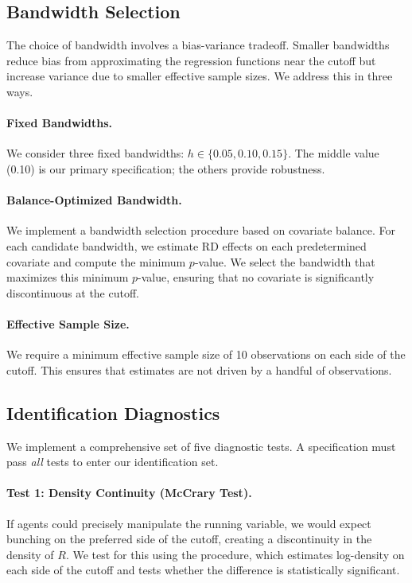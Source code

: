 \documentclass[12pt,a4paper]{article}
\begin{document}
\subsection{Bandwidth Selection}

The choice of bandwidth involves a bias-variance tradeoff. Smaller 
bandwidths reduce bias from approximating the regression functions 
near the cutoff but increase variance due to smaller effective sample 
sizes. We address this in three ways.

\paragraph{Fixed Bandwidths.}
We consider three fixed bandwidths: $h \in \{0.05, 0.10, 0.15\}$. The 
middle value (0.10) is our primary specification; the others provide 
robustness.

\paragraph{Balance-Optimized Bandwidth.}
We implement a bandwidth selection procedure based on covariate balance. 
For each candidate bandwidth, we estimate RD effects on each predetermined 
covariate and compute the minimum $p$-value. We select the bandwidth that 
maximizes this minimum $p$-value, ensuring that no covariate is 
significantly discontinuous at the cutoff.

\paragraph{Effective Sample Size.}
We require a minimum effective sample size of 10 observations on each 
side of the cutoff. This ensures that estimates are not driven by a 
handful of observations.

\subsection{Identification Diagnostics}

We implement a comprehensive set of five diagnostic tests. A specification 
must pass \textit{all} tests to enter our identification set.

\paragraph{Test 1: Density Continuity (McCrary Test).}
If agents could precisely manipulate the running variable, we would 
expect bunching on the preferred side of the cutoff, creating a 
discontinuity in the density of $R$. We test for this using the 
\citet{mccrary2008manipulation} procedure, which estimates log-density 
on each side of the cutoff and tests whether the difference is 
statistically significant.
\end{document}
